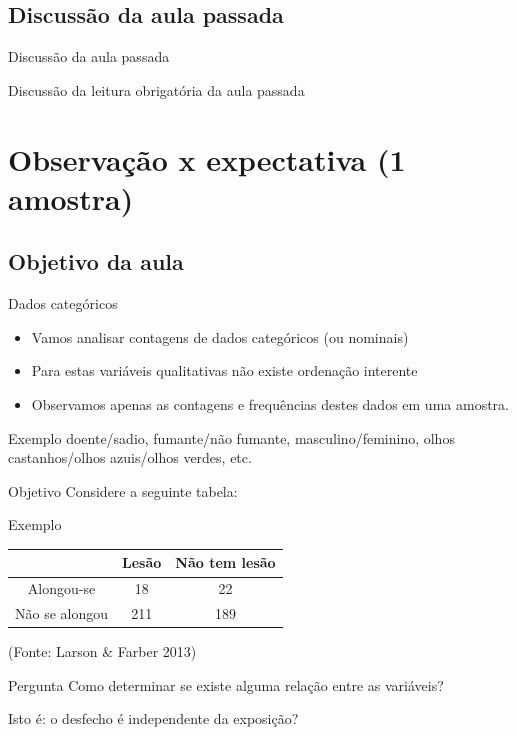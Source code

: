 \documentclass{beamer}
\begin{document}
\subsection{Discussão da aula passada}

\begin{frame}{Discussão da aula passada}
  \begin{block}{}
    Discussão da leitura obrigatória da aula passada
  \end{block}
\end{frame}

\section[1 amostra]{Observação x expectativa (1 amostra)}

\subsection{Objetivo da aula}

\begin{frame}{Dados categóricos}
  \begin{itemize}
  \item Vamos analisar contagens de dados categóricos (ou nominais)
  \item Para estas variáveis qualitativas não existe ordenação interente
  \item Observamos apenas as contagens e frequências destes dados em
    uma amostra.
  \end{itemize}
  \begin{exampleblock}{Exemplo}
    doente/sadio, fumante/não fumante, masculino/feminino, olhos
    castanhos/olhos azuis/olhos verdes, etc.
  \end{exampleblock}
\end{frame}

\begin{frame}{Objetivo}
  \small
  Considere a seguinte tabela:
  \begin{exampleblock}{Exemplo}
    \footnotesize
    \begin{tabular}{c|c|c}
                 & Lesão & Não tem lesão\\
      \hline
      Alongou-se & 18 & 22\\
      \hline
      Não se alongou & 211 & 189\\
    \end{tabular}

    \bigskip
    {\hfill \scriptsize (Fonte: Larson \& Farber 2013)}
  \end{exampleblock}
  \vfill
  \begin{block}{Pergunta}
    Como determinar se existe alguma relação entre as variáveis?

    \bigskip
    \small
    Isto é: o desfecho é independente da exposição?
  \end{block}
\end{frame}
\end{document}
